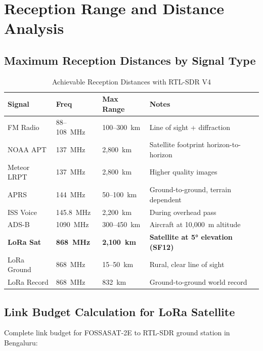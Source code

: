 \documentclass[12pt,a4paper]{article}
\begin{document}
\section{Reception Range and Distance Analysis}

\subsection{Maximum Reception Distances by Signal Type}

\begin{table}[h!]
\centering
\caption{Achievable Reception Distances with RTL-SDR V4}
\begin{tabular}{@{}lllp{4.5cm}@{}}
\toprule
\textbf{Signal} & \textbf{Freq} & \textbf{Max Range} & \textbf{Notes} \\
\midrule
FM Radio & 88--108~MHz & 100--300~km & Line of sight + diffraction \\
NOAA APT & 137~MHz & 2,800~km & Satellite footprint horizon-to-horizon \\
Meteor LRPT & 137~MHz & 2,800~km & Higher quality images \\
APRS & 144~MHz & 50--100~km & Ground-to-ground, terrain dependent \\
ISS Voice & 145.8~MHz & 2,200~km & During overhead pass \\
ADS-B & 1090~MHz & 300--450~km & Aircraft at 10,000~m altitude \\
\textbf{LoRa Sat} & \textbf{868~MHz} & \textbf{2,100~km} & \textbf{Satellite at 5° elevation (SF12)} \\
LoRa Ground & 868~MHz & 15--50~km & Rural, clear line of sight \\
LoRa Record & 868~MHz & 832~km & Ground-to-ground world record \\
\bottomrule
\end{tabular}
\end{table}

\subsection{Link Budget Calculation for LoRa Satellite}

Complete link budget for FOSSASAT-2E to RTL-SDR ground station in Bengaluru:
\end{document}
